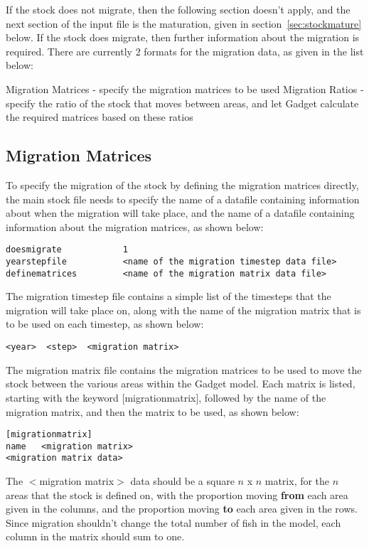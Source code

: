 \documentclass[10pt,twoside]{book}
\begin{document}
If the stock does not migrate, then the following section doesn't apply, and the next section of the input file is the maturation, given in section~\ref{sec:stockmature} below.  If the stock does migrate, then further information about the migration is required.  There are currently 2 formats for the migration data, as given in the list below:

\bigskip
Migration Matrices - specify the migration matrices to be used\newline
Migration Ratios - specify the ratio of the stock that moves between areas, and let Gadget calculate the required matrices based on these ratios

\subsection{Migration Matrices}
To specify the migration of the stock by defining the migration matrices directly, the main stock file needs to specify the name of a datafile containing information about when the migration will take place, and the name of a datafile containing information about the migration matrices, as shown below:

{\small\begin{verbatim}
doesmigrate            1
yearstepfile           <name of the migration timestep data file>
definematrices         <name of the migration matrix data file>
\end{verbatim}}

The migration timestep file contains a simple list of the timesteps that the migration will take place on, along with the name of the migration matrix that is to be used on each timestep, as shown below:

{\small\begin{verbatim}
<year>  <step>  <migration matrix>
\end{verbatim}}

The migration matrix file contains the migration matrices to be used to move the stock between the various areas within the Gadget model.  Each matrix is listed, starting with the keyword [migrationmatrix], followed by the name of the migration matrix, and then the matrix to be used, as shown below:

{\small\begin{verbatim}
[migrationmatrix]
name   <migration matrix>
<migration matrix data>
\end{verbatim}}

The $<$migration matrix$>$ data should be a square $n$ x $n$ matrix, for the $n$ areas that the stock is defined on, with the proportion moving {\bf from} each area given in the columns, and the proportion moving {\bf to} each area given in the rows.  Since migration shouldn't change the total number of fish in the model, each column in the matrix should sum to one.
\end{document}
